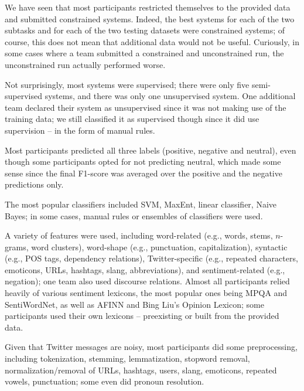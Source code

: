 

We have seen that most participants restricted themselves to the provided data and submitted constrained systems.
Indeed, the best systems for each of the two subtasks and for each of the two testing datasets were constrained systems;
of course, this does not mean that additional data would not be useful.
Curiously, in some cases where a team submitted a constrained and unconstrained run,
the unconstrained run actually performed worse.

Not surprisingly, most systems were supervised;
there were only five semi-supervised systems, and there was only one unsupervised system.
One additional team declared their system as unsupervised
since it was not making use of the training data;
we still classified it as supervised though since it did use supervision -- in the form of manual rules.

Most participants predicted all three labels (positive, negative and neutral),
even though some participants opted for not predicting neutral, which made some sense since the final F1-score
was averaged over the positive and the negative predictions only.

The most popular classifiers included SVM, MaxEnt, linear classifier, Naive Bayes;
in some cases, manual rules or ensembles of classifiers were used.

A variety of features were used, including
word-related (e.g., words, stems, $n$-grams, word clusters),
word-shape (e.g., punctuation, capitalization),
syntactic (e.g., POS tags, dependency relations),
Twitter-specific (e.g., repeated characters, emoticons, URLs, hashtags, slang, abbreviations),
and sentiment-related (e.g., negation);
one team also used discourse relations.
Almost all participants relied heavily of various sentiment lexicons,
the most popular ones being MPQA and SentiWordNet,
as well as AFINN and Bing Liu's Opinion Lexicon;
some participants used their own lexicons -- preexisting or built from the provided data.

Given that Twitter messages are noisy, most participants did some preprocessing, including
tokenization,
stemming, lemmatization,
stopword removal,
normalization/removal of URLs, hashtags, users, slang, emoticons, repeated vowels, punctuation;
some even did pronoun resolution.
